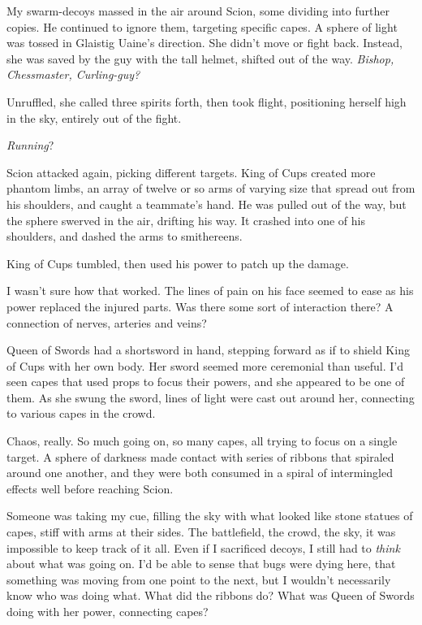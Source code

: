 My swarm-decoys massed in the air around Scion, some dividing into further copies.  He continued to ignore them, targeting specific capes.  A sphere of light was tossed in Glaistig Uaine's direction.  She didn't move or fight back.  Instead, she was saved by the guy with the tall helmet, shifted out of the way.  \emph{Bishop, Chessmaster, Curling-guy?}



Unruffled, she called three spirits forth, then took flight, positioning herself high in the sky, entirely out of the fight.



\emph{Running}?



Scion attacked again, picking different targets.  King of Cups created more phantom limbs, an array of twelve or so arms of varying size that spread out from his shoulders, and caught a teammate's hand.  He was pulled out of the way, but the sphere swerved in the air, drifting his way.  It crashed into one of his shoulders, and dashed the arms to smithereens.



King of Cups tumbled, then used his power to patch up the damage.



I wasn't sure how that worked.  The lines of pain on his face seemed to ease as his power replaced the injured parts.  Was there some sort of interaction there?  A connection of nerves, arteries and veins?



Queen of Swords had a shortsword in hand, stepping forward as if to shield King of Cups with her own body.  Her sword seemed more ceremonial than useful.  I'd seen capes that used props to focus their powers, and she appeared to be one of them.  As she swung the sword, lines of light were cast out around her, connecting to various capes in the crowd.



Chaos, really.  So much going on, so many capes, all trying to focus on a single target.  A sphere of darkness made contact with series of ribbons that spiraled around one another, and they were both consumed in a spiral of intermingled effects well before reaching Scion.



Someone was taking my cue, filling the sky with what looked like stone statues of capes, stiff with arms at their sides.  The battlefield, the crowd, the sky, it was impossible to keep track of it all.  Even if I sacrificed decoys, I still had to \emph{think} about what was going on.  I'd be able to sense that bugs were dying here, that something was moving from one point to the next, but I wouldn't necessarily know who was doing what.  What did the ribbons do?  What was Queen of Swords doing with her power, connecting capes?



